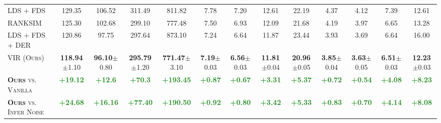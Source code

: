 \begin{table*}[h]
\begin{center}
{\begin{tabular}{l|cccc|cccc|cccc}
\textsc{LDS + FDS}~\citep{DIR} & 129.35 & 106.52 & 311.49 & 811.82 & 7.78 & 7.20 & 12.61 & 22.19 & 4.37 & 4.12 & 7.39 & 12.61 \\[1.5pt]
\textsc{RANKSIM}~\citep{RankSim} & 125.30 & 102.68 & 299.10 & 777.48 & 7.50 & 6.93 & 12.09 & 21.68 & 4.19 & 3.97 & 6.65 & 13.28 \\[1.5pt]
\textsc{LDS + FDS + DER}~\citep{DER} & 120.86 & 97.75 & 297.64 & 873.10 & 7.24 & 6.64 & 11.87 & 23.44 & 3.93 & 3.69 & 6.64 & 16.00 \\[1.5pt]
\textsc{VIR (Ours)} & \textbf{118.94}\scriptsize{$\pm$1.10} & \textbf{96.10}\scriptsize{$\pm$0.80} & \textbf{295.79}\scriptsize{$\pm$1.20} & \textbf{771.47}\scriptsize{$\pm$3.10} & \textbf{7.19}\scriptsize{$\pm$0.03} & \textbf{6.56}\scriptsize{$\pm$0.03} & \textbf{11.81}\scriptsize{$\pm$0.04} & \textbf{20.96}\scriptsize{$\pm$0.05} & \textbf{3.85}\scriptsize{$\pm$0.04} & \textbf{3.63}\scriptsize{$\pm$0.05} & \textbf{6.51}\scriptsize{$\pm$0.03} & \textbf{12.23}\scriptsize{$\pm$0.03} \\[1.5pt] \midrule\midrule
\textsc{\textbf{Ours} vs. Vanilla} & \textcolor{ForestGreen}{\textbf{+19.12}} & \textcolor{ForestGreen}{\textbf{+12.6}} & \textcolor{ForestGreen}{\textbf{+70.3}} & \textcolor{ForestGreen}{\textbf{+193.45}} & \textcolor{ForestGreen}{\textbf{+0.87}} & \textcolor{ForestGreen}{\textbf{+0.67}} & \textcolor{ForestGreen}{\textbf{+3.31}} & \textcolor{ForestGreen}{\textbf{+5.37}} & \textcolor{ForestGreen}{\textbf{+0.72}} & \textcolor{ForestGreen}{\textbf{+0.54}} & \textcolor{ForestGreen}{\textbf{+4.08}} & \textcolor{ForestGreen}{\textbf{+8.23}} \\[1.5pt]
\textsc{\textbf{Ours} vs. Infer Noise} & \textcolor{ForestGreen}{\textbf{+24.68}} & \textcolor{ForestGreen}{\textbf{+16.16}} & \textcolor{ForestGreen}{\textbf{+77.40}} & \textcolor{ForestGreen}{\textbf{+190.50}} & \textcolor{ForestGreen}{\textbf{+0.92}} & \textcolor{ForestGreen}{\textbf{+0.80}} & \textcolor{ForestGreen}{\textbf{+3.42}} & \textcolor{ForestGreen}{\textbf{+5.33}} & \textcolor{ForestGreen}{\textbf{+0.83}} & \textcolor{ForestGreen}{\textbf{+0.70}} & \textcolor{ForestGreen}{\textbf{+4.14}} & \textcolor{ForestGreen}{\textbf{+8.08}} \\[1.5pt]

\end{tabular}}
\end{center}
\end{table*}
